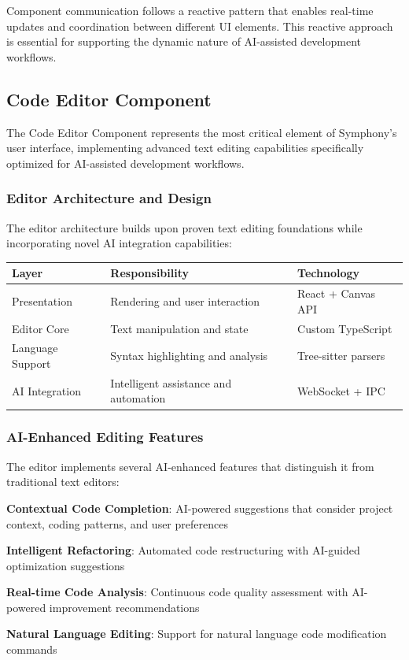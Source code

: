 Component communication follows a reactive pattern that enables real-time updates and coordination between different UI elements. This reactive approach is essential for supporting the dynamic nature of AI-assisted development workflows.

\subsection*{Code Editor Component}

The Code Editor Component represents the most critical element of Symphony's user interface, implementing advanced text editing capabilities specifically optimized for AI-assisted development workflows.

\subsubsection*{Editor Architecture and Design}

The editor architecture builds upon proven text editing foundations while incorporating novel AI integration capabilities:

\begin{center}
\begin{tabular}{@{}lll@{}}
\toprule
\textbf{Layer} & \textbf{Responsibility} & \textbf{Technology} \\
\midrule
Presentation & Rendering and user interaction & React + Canvas API \\
Editor Core & Text manipulation and state & Custom TypeScript \\
Language Support & Syntax highlighting and analysis & Tree-sitter parsers \\
AI Integration & Intelligent assistance and automation & WebSocket + IPC \\
\bottomrule
\end{tabular}
\end{center}

\subsubsection*{AI-Enhanced Editing Features}

The editor implements several AI-enhanced features that distinguish it from traditional text editors:

\begin{expandedlist}
    \item \textbf{Contextual Code Completion}: AI-powered suggestions that consider project context, coding patterns, and user preferences
    \item \textbf{Intelligent Refactoring}: Automated code restructuring with AI-guided optimization suggestions
    \item \textbf{Real-time Code Analysis}: Continuous code quality assessment with AI-powered improvement recommendations
    \item \textbf{Natural Language Editing}: Support for natural language code modification commands
\end{expandedlist}

